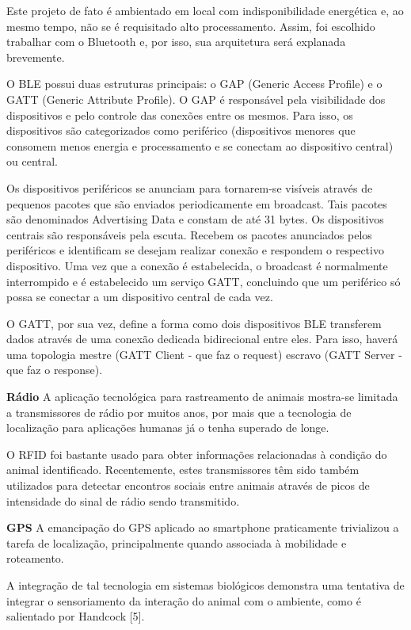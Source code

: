 Este projeto de fato é ambientado em local com indisponibilidade energética e, ao mesmo tempo, não se é requisitado alto processamento. Assim, foi escolhido trabalhar com o Bluetooth e, por isso, sua arquitetura será explanada brevemente.

O BLE possui duas estruturas principais: o GAP (Generic Access Profile) e o GATT (Generic Attribute Profile). O GAP é responsável pela visibilidade dos dispositivos e pelo controle das conexões entre os mesmos. Para isso, os dispositivos são categorizados como periférico (dispositivos menores que consomem menos energia e processamento e se conectam ao dispositivo central) ou central.

Os dispositivos periféricos se anunciam para tornarem-se visíveis através de pequenos pacotes que são enviados periodicamente em broadcast. Tais pacotes são denominados Advertising Data e constam de até 31 bytes. Os dispositivos centrais são responsáveis pela escuta. Recebem os pacotes anunciados pelos periféricos e identificam se desejam realizar conexão e respondem o respectivo dispositivo. Uma vez que a conexão é estabelecida, o broadcast é normalmente interrompido e é estabelecido um serviço GATT, concluindo que um periférico só possa se conectar a um dispositivo central de cada vez.

O GATT, por sua vez, define a forma como dois dispositivos BLE transferem dados através de uma conexão dedicada bidirecional entre eles. Para isso, haverá uma topologia mestre (GATT Client - que faz o request) escravo (GATT Server - que faz o response).

\textbf{Rádio}
A aplicação tecnológica para rastreamento de animais mostra-se limitada a transmissores de rádio por muitos anos, por mais que a tecnologia de localização para aplicações humanas já o tenha superado de longe.

O RFID foi bastante usado para obter informações relacionadas à condição do animal identificado. Recentemente, estes transmissores têm sido também utilizados para detectar encontros sociais entre animais através de picos de intensidade do sinal de rádio sendo transmitido.

\textbf{GPS}
A emancipação do GPS aplicado ao smartphone praticamente trivializou a tarefa de localização, principalmente quando associada à mobilidade e roteamento.

A integração de tal tecnologia em sistemas biológicos demonstra uma tentativa de integrar o sensoriamento da interação do animal com o ambiente, como é salientado por Handcock [5].

